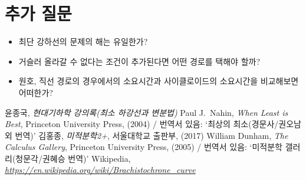 \section{추가 질문}

\begin{itemize}
\item 최단 강하선의 문제의 해는 유일한가?%
\item 거슬러 올라갈 수 없다는 조건이 추가된다면 어떤 경로를 택해야 할까?%
\item 원호, 직선 경로의 경우에서의 소요시간과 사이클로이드의 소요시간을 비교해보면 어떠한가?%
\end{itemize}

\begin{thebibliography}{99}
 윤종국, \emph{현대기하학 강의록(최소 하강선과 변분법)}
  Paul J.\ Nahin,
\emph{When Least is Best},
Princeton University Press, (2004) / 번역서 있음: `최상의 최소(경문사/권오남 외 번역)'
 김홍종,  
\emph{미적분학2+},
서울대학교 출판부, (2017)
 William Dunham, 
\emph{The Calculus Gallery},
Princeton University Press, (2005) / 번역서 있음: `미적분학 갤러리(청문각/권혜승 번역)'
 Wikipedia,
\href{https://en.wikipedia.org/wiki/Brachistochrone_curve}{\emph{https://en.wikipedia.org/wiki/Brachistochrone\_curve}}
\end{thebibliography}
